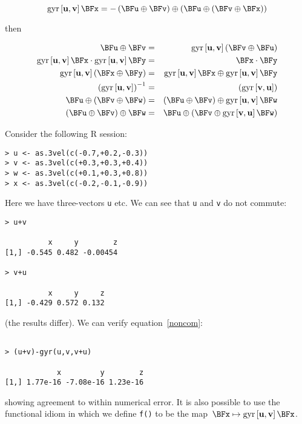 \documentclass[ijoc,nonblindrev]{informs3} %
\begin{document}
\begin{equation}
\gyr{u}{v}\BFx=-\left(\BFu\oplus\BFv\right)\oplus\left(\BFu\oplus\left(\BFv\oplus\BFx\right)\right)
\end{equation}

then

\begin{eqnarray}
\BFu\oplus\BFv &=&
\gyr{u}{v}\left(\BFv\oplus\BFu\right)\label{noncom}\\ \gyr{u}{v}\BFx\cdot\gyr{u}{v}\BFy
&=& \BFx\cdot\BFy\label{doteq}\\ \gyr{u}{v}\left(\BFx\oplus\BFy\right) &=&
\gyr{u}{v}\BFx\oplus\gyr{u}{v}\BFy\\ \left(\gyr{u}{v}\right)^{-1} &=&
\left(\gyr{v}{u}\right)\label{gyrinv}\\ \BFu\oplus\left(\BFv\oplus\BFw\right)
&=&\left(\BFu\oplus\BFv\right)\oplus\gyr{u}{v}\BFw\label{nonass1}\\ \left(\BFu\oplus\BFv\right)\oplus\BFw
&=&\BFu\oplus\left(\BFv\oplus\gyr{v}{u}\BFw\right)\label{nonass2}
\end{eqnarray}

Consider the following R session:

\begin{verbatim}
> u <- as.3vel(c(-0.7,+0.2,-0.3))
> v <- as.3vel(c(+0.3,+0.3,+0.4))
> w <- as.3vel(c(+0.1,+0.3,+0.8))
> x <- as.3vel(c(-0.2,-0.1,-0.9))

\end{verbatim}

Here we have three-vectors {\tt u} etc.  We can see that {\tt u} and
{\tt v} do not commute:

\begin{verbatim}
> u+v

          x     y        z
[1,] -0.545 0.482 -0.00454

> v+u

          x     y     z
[1,] -0.429 0.572 0.132

\end{verbatim}

(the results differ).  We can verify equation~\ref{noncom}:

\begin{verbatim}

> (u+v)-gyr(u,v,v+u)

            x         y        z 
[1,] 1.77e-16 -7.08e-16 1.23e-16

\end{verbatim}

showing agreement to within numerical error.  It is also possible to
use the functional idiom in which we define {\tt f()} to be the
map~$\BFx\mapsto\gyr{u}{v}\BFx$.
\end{document}
